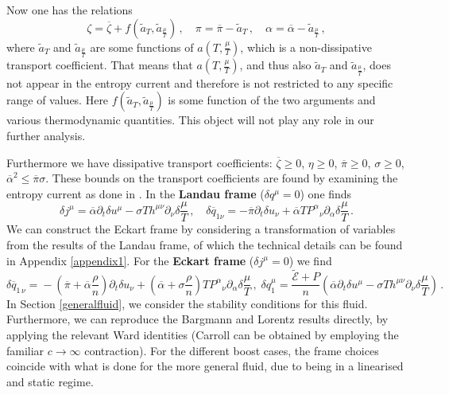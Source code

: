 \documentclass[superscriptaddress,prd,nofootinbib,preprintnumbers,longbibliography,11pt,eqsecnum]{revtex4-1}
\begin{document}
Now one has the relations
\begin{equation}
	\zeta
	=
	\overline{\zeta}
	+
	f(\tilde{a}_{T},\tilde{a}_{\frac{\mu}{T}})
	\,,
	\quad
	\pi 
	=
	\overline{\pi}
	-
	\tilde{a}_{T}
	\,,
	\quad
	\alpha
	=
	\overline{\alpha}
	-
	\tilde{a}_{\frac{\mu}{T}}
	\,,
\end{equation}
where $\tilde{a}_{T}$ and $\tilde{a}_{\frac{\mu}{T}}$ are some functions of $a(T,\frac{\mu}{T})$, which is a non-dissipative transport coefficient. That means that $a(T,\frac{\mu}{T})$, and thus also $\tilde{a}_{T}$ and $\tilde{a}_{\frac{\mu}{T}}$, does not appear in the entropy current and therefore is not restricted to any specific range of values. Here $f(\tilde{a}_{T},\tilde{a}_{\frac{\mu}{T}})$ is some function of the two arguments and various thermodynamic quantities. This object will not play any role in our further analysis.

Furthermore we have dissipative transport coefficients: $\overline{\zeta}\geq 0$, $\eta\geq0$, $\overline{\pi}\geq0$, $\sigma \geq0$, $\overline{\alpha}^{2}\leq \overline{\pi}\sigma$. These bounds on the transport coefficients are found by examining the entropy current as done in \cite{deBoer:2017abi}. In the \textbf{Landau frame} ($\delta q^{\mu}
	=
	0$) one finds
\begin{equation}\label{eq:genlau}
	\delta j^{\mu}=
	\overline{\alpha} \partial_{t}\delta u^{\mu}
	-
	\sigma T  h^{\mu\nu}\partial_{\nu}\delta\frac{\mu}{T}
	\,,
	\quad
	\delta\overline{q}_{1\nu}
	=
	-\overline{\pi}\partial_{t}\delta u_{\nu}+\overline{\alpha}T
 P^{\alpha}_{\;\;\,\nu}\partial_{\alpha}\delta\frac{\mu}{T}
	\,.
\end{equation}
We can construct the Eckart frame by considering a transformation of variables from the results of the Landau frame, of which the technical details can be found in Appendix \ref{appendix1}. For the \textbf{Eckart frame} ($\delta j^{\mu}=0$) we find
\begin{equation}\label{eq:geneck}
	\delta \overline{q}_{1\,\nu}
	\!=\!
	-
	\!
	\left(
		\overline{\pi}
		+
		\overline{\alpha}\frac{\rho}{n}
	\right)
	\!
	\partial_{t}\delta u_{\nu}
	+
	\!
	\left(
		\overline{\alpha}
		+
		\sigma\frac{\rho}{n} 
	\right)
	\!
	T
 P^{\alpha}_{\;\;\,\nu}\partial_{\alpha}\delta\frac{\mu}{T}
	\,,
	\;
	\delta q^{\mu}_{1}
	\!=\!
\frac{\tilde{\mathcal{E}}+P}{n} 
	\!
	\left(
		\overline{\alpha} \partial_{t}\delta u^{\mu}
		-
		\sigma T  h^{\mu\nu}\partial_{\nu}\delta\frac{\mu}{T}
	\right)
	\!
	\,.
\end{equation}
In Section \ref{generalfluid}, we consider the stability conditions for this fluid. Furthermore, we can reproduce the Bargmann and Lorentz results directly, by applying the relevant Ward identities (Carroll can be obtained by employing the familiar $c\to\infty$ contraction). For the different boost cases, the frame choices coincide with what is done for the more general fluid, due to being in a linearised and static regime.
\end{document}

